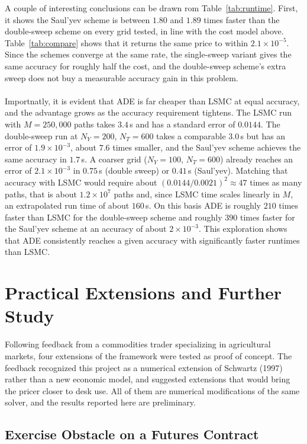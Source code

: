 \documentclass[12pt,a4paper]{article}
\begin{document}
A couple of interesting conclusions can be drawn rom Table~\ref{tab:runtime}. First, it shows the Saul'yev scheme is between $1.80$ and $1.89$ times faster than the double-sweep scheme on every grid tested, in line with the cost model above. Table~\ref{tab:compare} shows that it returns the same price to within $2.1\times10^{-5}$. Since the schemes converge at the same rate, the single-sweep variant gives the same accuracy for roughly half the cost, and the double-sweep scheme's extra sweep does not buy a measurable accuracy gain in this problem.\\\\
Importnatly, it is evident that ADE is far cheaper than LSMC at equal accuracy, and the advantage grows as the accuracy requirement tightens. The LSMC run with $M=250{,}000$ paths takes $3.4$\,s and has a standard error of $0.0144$. The double-sweep run at $N_Y=200$, $N_T=600$ takes a comparable $3.0$\,s but has an error of $1.9\times10^{-3}$, about $7.6$ times smaller, and the Saul'yev scheme achieves the same accuracy in $1.7$\,s. A coarser grid ($N_Y=100$, $N_T=600$) already reaches an error of $2.1\times10^{-3}$ in $0.75$\,s (double sweep) or $0.41$\,s (Saul'yev). Matching that accuracy with LSMC would require about $(0.0144/0.0021)^2\approx47$ times as many paths, that is about $1.2\times10^{7}$ paths and, since LSMC time scales linearly in $M$, an extrapolated run time of about $160$\,s. On this basis ADE is roughly $210$ times faster than LSMC for the double-sweep scheme and roughly $390$ times faster for the Saul'yev scheme at an accuracy of about $2\times10^{-3}$. This exploration shows that ADE consistently reaches a given accuracy with significantly faster runtimes than LSMC.

\newpage


\section{Practical Extensions and Further Study}\label{ch:further}

Following feedback from a commodities trader specializing in agricultural markets, four extensions of the framework were tested as proof of concept. The feedback recognized this project as a numerical extension of Schwartz (1997) rather than a new economic model, and suggested extensions that would bring the pricer closer to desk use. All of them are numerical modifications of the same solver, and the results reported here are preliminary.

\subsection{Exercise Obstacle on a Futures Contract}
\end{document}
